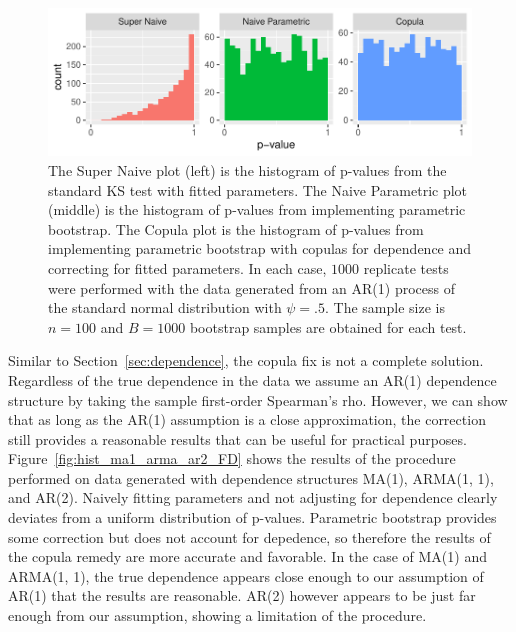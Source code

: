 \documentclass[12pt, letterpaper, titlepage]{article}
\begin{document}
\begin{figure}[tbp]
  \centering
  \includegraphics{hist_ar1_FD}
  \caption{The Super Naive plot (left) is the histogram of p-values from the 
  standard KS test with fitted parameters. The Naive Parametric plot (middle) is
  the histogram of p-values from implementing parametric bootstrap. The Copula 
  plot is the histogram of p-values from implementing parametric bootstrap with 
  copulas for dependence and correcting for fitted parameters. In each case, 
  $1000$ replicate tests were performed with the data generated from an AR(1) 
  process of the standard normal distribution with $\psi = .5$. The sample size 
  is $n = 100$ and $B = 1000$ bootstrap samples are obtained for each test.}
  \label{fig:hist_ar1_FD}
\end{figure}

Similar to Section~\ref{sec:dependence}, the copula fix is not a complete 
solution. Regardless of the true dependence in the data we assume an AR(1) 
dependence structure by taking the sample first-order Spearman's rho. However, 
we can show that as long as the AR(1) assumption is a close approximation, the 
correction still provides a reasonable results that can be useful for 
practical purposes. Figure~\ref{fig:hist_ma1_arma_ar2_FD} shows the results of 
the procedure performed on data generated with dependence structures MA(1), 
ARMA(1, 1), and AR(2). Naively fitting parameters and not adjusting for 
dependence clearly deviates from a uniform distribution of p-values. Parametric 
bootstrap provides some correction but does not account for depedence, so 
therefore the results of the copula remedy are more accurate and favorable.
In the case of MA(1) and ARMA(1, 1), the true dependence appears close enough 
to our assumption of AR(1) that the results are reasonable. AR(2) however
appears to be just far enough from our assumption, showing a limitation of the 
procedure.
\end{document}
